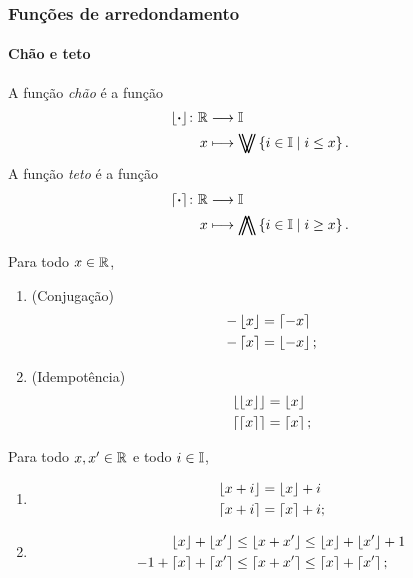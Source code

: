 \subsubsection{Funções de arredondamento}


\paragraph{Chão e teto}

\begin{definition}
A função \emph{chão} é a função
	\begin{align*}
	\func{\chao{\var}}{\R}{\Z}{x}{\max\set{i \in \Z}{i \leq x}}.
	\end{align*}
A função \emph{teto} é a função
	\begin{align*}
	\func{\teto{\var}}{\R}{\Z}{x}{\min\set{i \in \Z}{i \geq x}}.
	\end{align*}
\end{definition}

\begin{exercise}
Para todo $x \in \mathbb{R}$,
	\begin{enumerate}
	\item (Conjugação)
		\begin{align*}
		-\left\lfloor{x}\right\rfloor &= \left\lceil{-x}\right\rceil \\
		-\left\lceil{x}\right\rceil &= \left\lfloor{-x}\right\rfloor;
		\end{align*}
	\item (Idempotência)
		\begin{align*}
		\left\lfloor{\left\lfloor{x}\right\rfloor}\right\rfloor &= \left\lfloor{x}\right\rfloor \\
		\left\lceil{\left\lceil{x}\right\rceil}\right\rceil &= \left\lceil{x}\right\rceil;
		\end{align*}
	\end{enumerate}
\end{exercise}



\begin{exercise}
Para todo $x, x' \in \mathbb{R}$ e todo $i \in \mathbb{I}$,
	\begin{enumerate}
	\item
		\begin{align*}
		\left\lfloor{x+i}\right\rfloor &= \left\lfloor{x}\right\rfloor+i \\
		\left\lceil{x+i}\right\rceil &= \left\lceil{x}\right\rceil+i;
		\end{align*}

	\item
		\begin{align*}
		\left\lfloor{x}\right\rfloor+\left\lfloor{x'}\right\rfloor &\leq \left\lfloor{x+x'}\right\rfloor \leq \left\lfloor{x}\right\rfloor+\left\lfloor{x'}\right\rfloor+1 \\
		-1+\left\lceil{x}\right\rceil+\left\lceil{x'}\right\rceil &\leq \left\lceil{x+x'}\right\rceil \leq \left\lceil{x}\right\rceil+\left\lceil{x'}\right\rceil;
		\end{align*}
	\end{enumerate}
\end{exercise}



